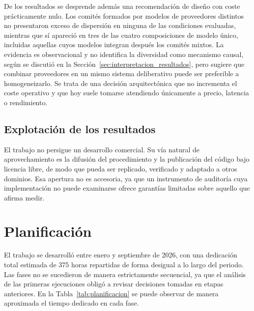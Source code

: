 De los resultados se desprende además una recomendación de diseño con coste prácticamente nulo. Los comités formados por modelos de proveedores distintos no presentaron exceso de dispersión en ninguna de las condiciones evaluadas, mientras que sí apareció en tres de las cuatro composiciones de modelo único, incluidas aquellas cuyos modelos integran después los comités mixtos. La evidencia es observacional y no identifica la diversidad como mecanismo causal, según se discutió en la Sección~\ref{sec:interpretacion_resultados}, pero sugiere que combinar proveedores en un mismo sistema deliberativo puede ser preferible a homogeneizarlo. Se trata de una decisión arquitectónica que no incrementa el coste operativo y que hoy suele tomarse atendiendo únicamente a precio, latencia o rendimiento.

\subsection{Explotación de los resultados}

El trabajo no persigue un desarrollo comercial. Su vía natural de aprovechamiento es la difusión del procedimiento y la publicación del código bajo licencia libre, de modo que pueda ser replicado, verificado y adaptado a otros dominios. Esa apertura no es accesoria, ya que un instrumento de auditoría cuya implementación no puede examinarse ofrece garantías limitadas sobre aquello que afirma medir.

\section{Planificación}
\label{sec:planificacion}

El trabajo se desarrolló entre enero y septiembre de 2026, con una dedicación total estimada de 375 horas repartidas de forma desigual a lo largo del periodo. Las fases no se sucedieron de manera estrictamente secuencial, ya que el análisis de las primeras ejecuciones obligó a revisar decisiones tomadas en etapas anteriores. En la Tabla~\ref{tab:planificacion} se puede observar de manera aproximada el tiempo dedicado en cada fase.

